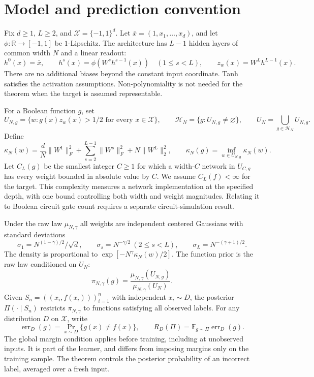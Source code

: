 \documentclass[11pt]{article}
\theoremstyle{definition}
\newcommand{\R}{\mathbb R}
\newcommand{\E}{\mathbb E}
\begin{document}
\section{Model and prediction convention}\label{sec:model}
Fix $d\geq1$, $L\geq2$, and $\mathcal X=\{-1,1\}^d$. Let $\bar x=(1,x_1,\ldots,x_d)$, and let $\phi:\R\to[-1,1]$ be $1$-Lipschitz. The architecture has $L-1$ hidden layers of common width $N$ and a linear readout:
\[
 h^0(x)=\bar x,\qquad h^s(x)=\phi(W^s h^{s-1}(x))\quad(1\leq s<L),
 \qquad z_w(x)=W^Lh^{L-1}(x).
\]
There are no additional biases beyond the constant input coordinate. Tanh satisfies the activation assumptions. Non-polynomiality is not needed for the theorem when the target is assumed representable.

For a Boolean function $g$, set
\[
 U_{N,g}=\{w:g(x)z_w(x)>1/2\text{ for every }x\in\mathcal X\},
 \qquad \mathcal H_N=\{g:U_{N,g}\ne\varnothing\},
 \qquad U_N=\bigcup_{g\in\mathcal H_N}U_{N,g}.
\]
Define
\[
 \kappa_N(w)=\frac dN\|W^1\|_F^2+
 \sum_{s=2}^{L-1}\|W^s\|_F^2+N\|W^L\|_2^2,
 \qquad \kappa_N(g)=\inf_{w\in U_{N,g}}\kappa_N(w).
\]
Let $C_L(g)$ be the smallest integer $C\geq1$ for which a width-$C$ network in $U_{C,g}$ has every weight bounded in absolute value by $C$. We assume $C_L(f)<\infty$ for the target. This complexity measures a network implementation at the specified depth, with one bound controlling both width and weight magnitudes. Relating it to Boolean circuit gate count requires a separate circuit-simulation result.

Under the raw law $\mu_{N,\gamma}$ all weights are independent centered Gaussians with standard deviations
\[
 \sigma_1=N^{(1-\gamma)/2}/\sqrt d,\qquad
 \sigma_s=N^{-\gamma/2}\ (2\leq s<L),\qquad
 \sigma_L=N^{-(\gamma+1)/2}.
\]
The density is proportional to $\exp[-N^\gamma\kappa_N(w)/2]$.
The function prior is the raw law conditioned on $U_N$:
\[
 \pi_{N,\gamma}(g)=\frac{\mu_{N,\gamma}(U_{N,g})}{\mu_{N,\gamma}(U_N)}.
\]
Given $S_n=((x_i,f(x_i)))_{i=1}^n$ with independent $x_i\sim D$, the posterior $\Pi(\cdot\mid S_n)$ restricts $\pi_{N,\gamma}$ to functions satisfying all observed labels. For any distribution $D$ on $\mathcal X$, write
\[
 \operatorname{err}_D(g)=\Pr_{x\sim D}\{g(x)\ne f(x)\},
 \qquad R_D(\Pi)=\E_{g\sim\Pi}\operatorname{err}_D(g).
\]
The global margin condition applies before training, including at unobserved inputs. It is part of the learner, and differs from imposing margins only on the training sample. The theorem controls the posterior probability of an incorrect label, averaged over a fresh input.
\end{document}
